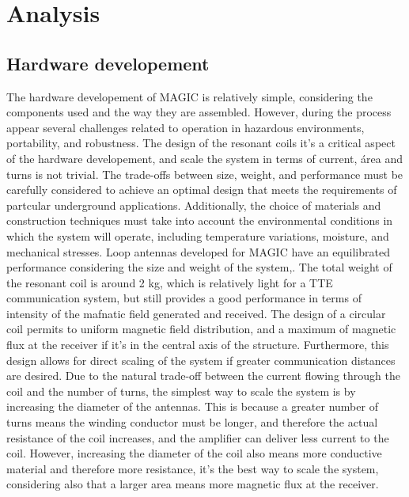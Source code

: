 \chapter{Analysis}\label{ch:analysis}

\section{Hardware developement}
 The hardware developement of MAGIC is relatively simple, considering the components used and the way they are assembled. However, during the process appear several challenges related to operation in hazardous environments, portability, and robustness.
 \newp
    The design of the resonant coils it's a critical aspect of the hardware developement, and scale the system in terms of current, área and turns is not trivial. The trade-offs between size, weight, and performance must be carefully considered to achieve an optimal design that meets the requirements of partcular underground applications.
 \newp
    Additionally, the choice of materials and construction techniques must take into account the environmental conditions in which the system will operate, including temperature variations, moisture, and mechanical stresses.
\newp
Loop antennas developed for MAGIC have an equilibrated performance considering the size and weight of the system,. The total weight of the resonant coil is around 2 kg, which is relatively light for a TTE communication system, but still provides a good performance in terms of intensity of the mafnatic field generated and received. The design of a circular coil permits to uniform magnetic field distribution, and a maximum of magnetic flux at the receiver if it's in the central axis of the structure. Furthermore, this design allows for direct scaling of the system if greater communication distances are desired. Due to the natural trade-off between the current flowing through the coil and the number of turns, the simplest way to scale the system is by increasing the diameter of the antennas. This is because a greater number of turns means the winding conductor must be longer, and therefore the actual resistance of the coil increases, and the amplifier can deliver less current to the coil. However, increasing the diameter of the coil also means more conductive material and therefore more resistance, it's the best way to scale the system, considering also that a larger area means more magnetic flux at the receiver.

